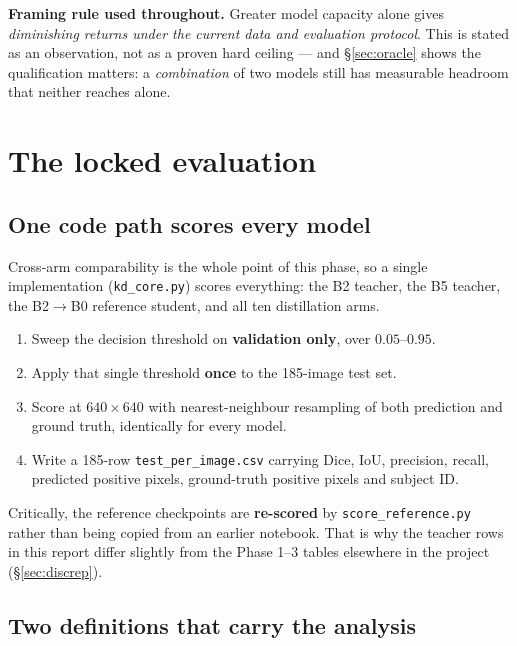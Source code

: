 \documentclass[11pt]{article}
\begin{document}
\begin{keybox}
\textbf{Framing rule used throughout.} Greater model capacity alone gives \emph{diminishing
returns under the current data and evaluation protocol}. This is stated as an observation, not as
a proven hard ceiling --- and \S\ref{sec:oracle} shows the qualification matters: a
\emph{combination} of two models still has measurable headroom that neither reaches alone.
\end{keybox}

\section{The locked evaluation}
\label{sec:lock}

\subsection{One code path scores every model}

Cross-arm comparability is the whole point of this phase, so a single implementation
(\texttt{kd\_core.py}) scores everything: the B2 teacher, the B5 teacher, the B2$\to$B0 reference
student, and all ten distillation arms.

\begin{enumerate}[leftmargin=1.6em,itemsep=2pt]
  \item Sweep the decision threshold on \textbf{validation only}, over $0.05$--$0.95$.
  \item Apply that single threshold \textbf{once} to the 185-image test set.
  \item Score at $640\times640$ with nearest-neighbour resampling of both prediction and ground
        truth, identically for every model.
  \item Write a 185-row \texttt{test\_per\_image.csv} carrying Dice, IoU, precision, recall,
        predicted positive pixels, ground-truth positive pixels and subject ID.
\end{enumerate}

Critically, the reference checkpoints are \textbf{re-scored} by \texttt{score\_reference.py} rather
than being copied from an earlier notebook. That is why the teacher rows in this report differ
slightly from the Phase 1--3 tables elsewhere in the project (\S\ref{sec:discrep}).

\subsection{Two definitions that carry the analysis}
\end{document}
